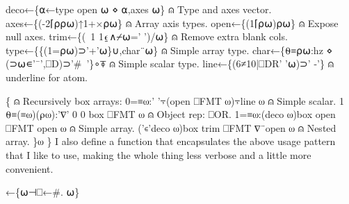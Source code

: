 \documentclass{article}%
\begin{document}
        deco←\{⍺←type open ⍵ ⋄ ⍺,axes ⍵\}                           ⍝ Type and axes vector.
        axes←\{(-2⌈⍴⍴⍵)↑1+×⍴⍵\}                                                                  ⍝ Array axis types.
        open←\{(1⌈⍴⍵)⍴⍵\}                                                                                             ⍝ Expose null axes.
        trim←\{(~1 1⍷∧⌿⍵=' ')/⍵\}                                                             ⍝ Remove extra blank cols.
        type←\{\{(1=⍴⍵)⊃'+'⍵\}∪,char¨⍵\}                                     ⍝ Simple array type.
        char←\{⍬≡⍴⍵:hz ⋄ (⊃⍵∊'¯',⎕D)⊃'#~'\}∘⍕          ⍝ Simple scalar type.
        line←\{(6≠10|⎕DR' '⍵)⊃' -'\}                                            ⍝ underline for atom.

        \{                                                                                                                                                       ⍝ Recursively box arrays:
                0=≡⍵:' '⍪(open ⎕FMT ⍵)⍪line ⍵                             ⍝ Simple scalar.
                1 ⍬≡(≡⍵)(⍴⍵):'∇' 0 0 box ⎕FMT ⍵                       ⍝ Object rep: ⎕OR.
                1=≡⍵:(deco ⍵)box open ⎕FMT open ⍵             ⍝ Simple array.
                ('∊'deco ⍵)box trim ⎕FMT ∇¨open ⍵            ⍝ Nested array.
        \}⍵
\}
\eatline
{}\nwendcode{}\nwdocspar
I also define a function {\Tt{}\nwendquote} that encapsulates the above usage
pattern that I like to use, making the whole thing less verbose and
a little more convenient.

\nwenddocs{}\endmoddef\nwstartdeflinemarkup\nwenddeflinemarkup
{}←\{⍵⊣⎕←#. ⍵\}
\eatline
{}\nwendcode{}\nwdocspar
\end{document}
